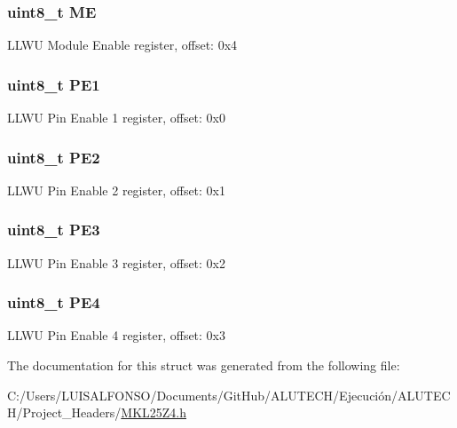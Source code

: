 \subsubsection[{M\+E}]{\setlength{\rightskip}{0pt plus 5cm}uint8\+\_\+t M\+E}\label{struct_l_l_w_u___mem_map_a44a00f9c297b510a86f67182a14a8791}
L\+L\+W\+U Module Enable register, offset\+: 0x4 \hypertarget{struct_l_l_w_u___mem_map_a18a3a6d7960b3ef22037fe811bac93bc}{}
\subsubsection[{P\+E1}]{\setlength{\rightskip}{0pt plus 5cm}uint8\+\_\+t P\+E1}\label{struct_l_l_w_u___mem_map_a18a3a6d7960b3ef22037fe811bac93bc}
L\+L\+W\+U Pin Enable 1 register, offset\+: 0x0 \hypertarget{struct_l_l_w_u___mem_map_a860bd4a06778c731727adeb26d0b62f1}{}
\subsubsection[{P\+E2}]{\setlength{\rightskip}{0pt plus 5cm}uint8\+\_\+t P\+E2}\label{struct_l_l_w_u___mem_map_a860bd4a06778c731727adeb26d0b62f1}
L\+L\+W\+U Pin Enable 2 register, offset\+: 0x1 \hypertarget{struct_l_l_w_u___mem_map_a901d99ca6830302e9bed1cfdac073c15}{}
\subsubsection[{P\+E3}]{\setlength{\rightskip}{0pt plus 5cm}uint8\+\_\+t P\+E3}\label{struct_l_l_w_u___mem_map_a901d99ca6830302e9bed1cfdac073c15}
L\+L\+W\+U Pin Enable 3 register, offset\+: 0x2 \hypertarget{struct_l_l_w_u___mem_map_a6377b5e2e0fc8e3423b16bc0758ee155}{}
\subsubsection[{P\+E4}]{\setlength{\rightskip}{0pt plus 5cm}uint8\+\_\+t P\+E4}\label{struct_l_l_w_u___mem_map_a6377b5e2e0fc8e3423b16bc0758ee155}
L\+L\+W\+U Pin Enable 4 register, offset\+: 0x3 

The documentation for this struct was generated from the following file\+:\begin{DoxyCompactItemize}
\item 
C\+:/\+Users/\+L\+U\+I\+S\+A\+L\+F\+O\+N\+S\+O/\+Documents/\+Git\+Hub/\+A\+L\+U\+T\+E\+C\+H/\+Ejecución/\+A\+L\+U\+T\+E\+C\+H/\+Project\+\_\+\+Headers/\hyperlink{_m_k_l25_z4_8h}{M\+K\+L25\+Z4.\+h}\end{DoxyCompactItemize}
